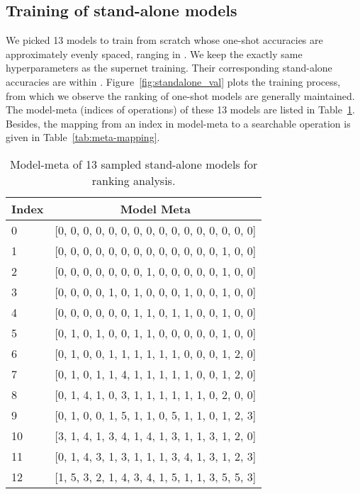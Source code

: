 \documentclass[10pt,twocolumn,letterpaper]{article}
\theoremstyle{definition}
\begin{document}
\subsection{Training of stand-alone models}

We picked 13 models to train from scratch whose one-shot accuracies are approximately evenly spaced, ranging in . We keep the exactly same hyperparameters as the supernet training. Their corresponding stand-alone accuracies are within . Figure~\ref{fig:standalone_val} plots the training process, from which we observe the ranking of one-shot models are generally maintained. 
The model-meta (indices of operations) of these 13 models are listed in Table~\ref{tab:13models}. Besides, the mapping from an index in model-meta to a searchable operation is given in Table~\ref{tab:meta-mapping}.

\setlength{\tabcolsep}{4pt}
\begin{table}[ht]
\begin{center}
		\begin{small}
				\begin{tabular}{lc}
					\toprule
					Index & Model Meta \\
					\midrule
					0 & [0, 0, 0, 0, 0, 0, 0, 0, 0, 0, 0, 0, 0, 0, 0, 0] \\
					1 & [0, 0, 0, 0, 0, 0, 0, 0, 0, 0, 0, 0, 0, 1, 0, 0] \\
					2 & [0, 0, 0, 0, 0, 0, 0, 1, 0, 0, 0, 0, 0, 1, 0, 0] \\
					3 & [0, 0, 0, 0, 1, 0, 1, 0, 0, 0, 1, 0, 0, 1, 0, 0] \\
					4 & [0, 0, 0, 0, 0, 0, 1, 1, 0, 1, 1, 0, 0, 1, 0, 0] \\
					5 & [0, 1, 0, 1, 0, 0, 1, 1, 0, 0, 0, 0, 0, 1, 0, 0] \\
					6 & [0, 1, 0, 0, 1, 1, 1, 1, 1, 1, 0, 0, 0, 1, 2, 0] \\
					7 & [0, 1, 0, 1, 1, 4, 1, 1, 1, 1, 1, 0, 0, 1, 2, 0] \\
					8 & [0, 1, 4, 1, 0, 3, 1, 1, 1, 1, 1, 1, 0, 2, 0, 0] \\
					9 & [0, 1, 0, 0, 1, 5, 1, 1, 0, 5, 1, 1, 0, 1, 2, 3] \\
					10 &[3, 1, 4, 1, 3, 4, 1, 4, 1, 3, 1, 1, 3, 1, 2, 0]\\
					11 & [0, 1, 4, 3, 1, 3, 1, 1, 1, 3, 4, 1, 3, 1, 2, 3]\\
					12 & [1, 5, 3, 2, 1, 4, 3, 4, 1, 5, 1, 1, 3, 5, 5, 3]\\
					\bottomrule
				\end{tabular}
		\end{small}
	\end{center}
	\caption{Model-meta of  13 sampled stand-alone models for ranking analysis.}
	\label{tab:13models}
\end{table}
\end{document}
